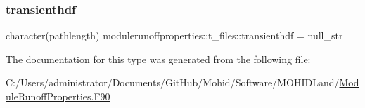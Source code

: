 \mbox{\label{structmodulerunoffproperties_1_1t__files_aaaa01bbec06e8e02ae9d77b773f92acf}} 
\subsubsection{\texorpdfstring{transienthdf}{transienthdf}}
{\footnotesize\ttfamily character(pathlength) modulerunoffproperties\+::t\+\_\+files\+::transienthdf = null\+\_\+str\hspace{0.3cm}{\ttfamily [private]}}



The documentation for this type was generated from the following file\+:\begin{DoxyCompactItemize}
\item 
C\+:/\+Users/administrator/\+Documents/\+Git\+Hub/\+Mohid/\+Software/\+M\+O\+H\+I\+D\+Land/\mbox{\hyperlink{_module_runoff_properties_8_f90}{Module\+Runoff\+Properties.\+F90}}\end{DoxyCompactItemize}
